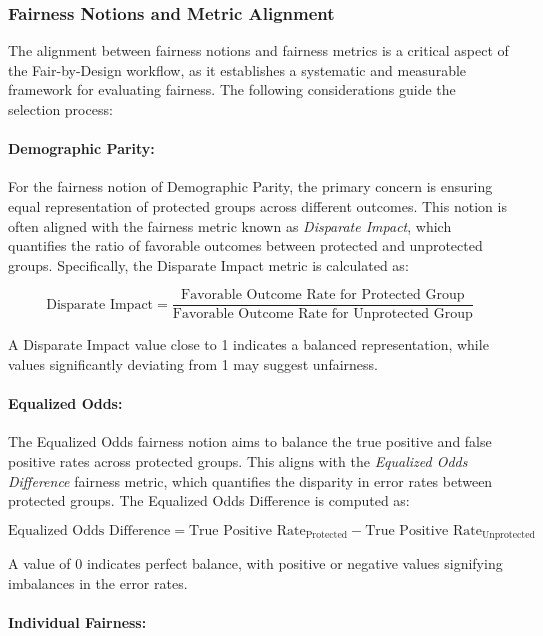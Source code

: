 \subsubsection{Fairness Notions and Metric Alignment}
\label{subsub:alignment}

The alignment between fairness notions and fairness metrics is a critical aspect of the Fair-by-Design workflow, as it establishes a systematic and measurable framework for evaluating fairness. The following considerations guide the selection process:

\paragraph{Demographic Parity:}

For the fairness notion of Demographic Parity, the primary concern is ensuring equal representation of protected groups across different outcomes. This notion is often aligned with the fairness metric known as \emph{Disparate Impact}, which quantifies the ratio of favorable outcomes between protected and unprotected groups. Specifically, the Disparate Impact metric is calculated as:

\[
\text{Disparate Impact} = \frac{\text{Favorable Outcome Rate for Protected Group}}{\text{Favorable Outcome Rate for Unprotected Group}}
\]

A Disparate Impact value close to 1 indicates a balanced representation, while values significantly deviating from 1 may suggest unfairness.

\paragraph{Equalized Odds:}

The Equalized Odds fairness notion aims to balance the true positive and false positive rates across protected groups. This aligns with the \emph{Equalized Odds Difference} fairness metric, which quantifies the disparity in error rates between protected groups. The Equalized Odds Difference is computed as:

\[
\text{Equalized Odds Difference} = \text{True Positive Rate}_{\text{Protected}} - \text{True Positive Rate}_{\text{Unprotected}}
\]

A value of 0 indicates perfect balance, with positive or negative values signifying imbalances in the error rates.

\paragraph{Individual Fairness:}

